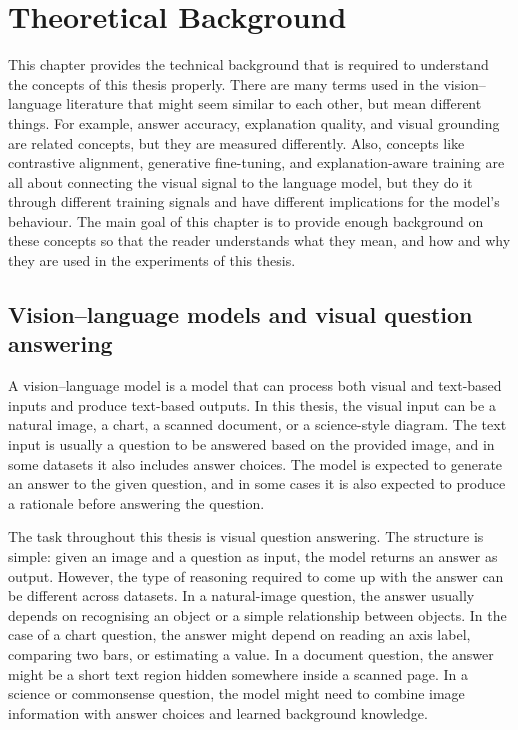\chapter{Theoretical Background}
This chapter provides the technical background that is required to understand the concepts of this thesis properly.
There are many terms used in the vision--language literature that might seem similar to each other, but mean different things.
For example, answer accuracy, explanation quality, and visual grounding are related concepts, but they are measured differently.
Also, concepts like contrastive alignment, generative fine-tuning, and explanation-aware training are all about connecting the visual signal to the language model,
but they do it through different training signals and have different implications for the model's behaviour.
The main goal of this chapter is to provide enough background on these concepts so that the reader understands
what they mean, and how and why they are used in the experiments of this thesis.

\section{Vision--language models and visual question answering}
A vision--language model is a model that can process both visual and text-based inputs and produce text-based outputs.
In this thesis, the visual input can be a natural image, a chart, a scanned document, or a science-style diagram.
The text input is usually a question to be answered based on the provided image, and in some datasets it also includes answer choices.
The model is expected to generate an answer to the given question, and in some cases it is also expected to produce a rationale before answering the question.

The task throughout this thesis is visual question answering.
The structure is simple: given an image and a question as input, the model returns an answer as output.
However, the type of reasoning required to come up with the answer can be different across datasets.
In a natural-image question, the answer usually depends on recognising an object or a simple relationship between objects.
In the case of a chart question, the answer might depend on reading an axis label, comparing two bars, or estimating a value.
In a document question, the answer might be a short text region hidden somewhere inside a scanned page.
In a science or commonsense question, the model might need to combine image information with answer choices and learned background knowledge.

